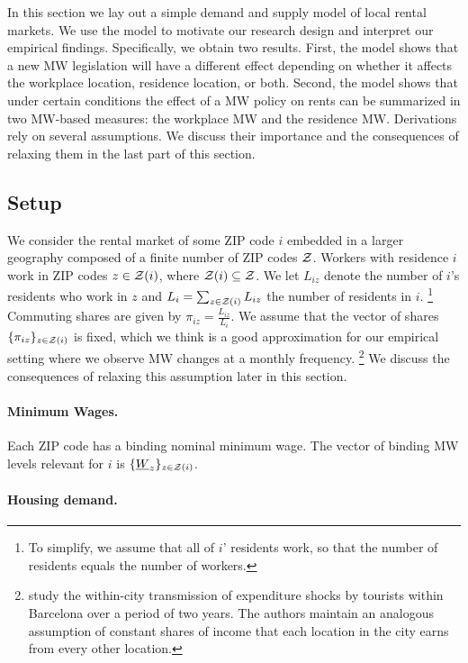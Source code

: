 
In this section we lay out a simple demand and supply model of local rental 
markets.
We use the model to motivate our research design and interpret our empirical
findings.
Specifically, we obtain two results.
First, the model shows that a new MW legislation will have a different effect 
depending on whether it affects the workplace location, residence location, or 
both.
Second, the model shows that under certain conditions the effect of a MW 
policy on rents can be summarized in two MW-based measures: 
the workplace MW and the residence MW.
Derivations rely on several assumptions.
We discuss their importance and the consequences of relaxing them in the
last part of this section.

\subsection{Setup}

We consider the rental market of some ZIP code $i$ embedded in a larger geography 
composed of a finite number of ZIP codes $\mathcal{Z}$.
Workers with residence $i$ work in ZIP codes $z\in\mathcal{Z}(i)$, where 
$\mathcal{Z}(i)\subseteq\mathcal{Z}$.
We let $L_{iz}$ denote the number of $i$'s residents who work in $z$ and 
$L_i = \sum_{z \in \mathcal{Z}(i)} L_{iz}$ the number of residents in $i$.%
\footnote{To simplify, we assume that all of $i$' residents work, so that the 
number of residents equals the number of workers.}
Commuting shares are given by $\pi_{iz} = \frac{L_{iz}}{L_i}$.
We assume that the vector of shares $\{\pi_{iz}\}_{z\in\mathcal{Z}(i)}$ is fixed,
which we think is a good approximation for our empirical setting where we 
observe MW changes at a monthly frequency.%
\footnote{\textcite{AllenEtAl2020} study the within-city transmission of 
expenditure shocks by tourists within Barcelona over a period of two years.
The authors maintain an analogous assumption of constant shares of income that
each location in the city earns from every other location.}
We discuss the consequences of relaxing this assumption later in this section.

\paragraph{Minimum Wages.}

Each ZIP code has a binding nominal minimum wage.
The vector of binding MW levels relevant for $i$ is $\{\underline{W}_z\}_{z\in\mathcal{Z}(i)}$.

\paragraph{Housing demand.}

